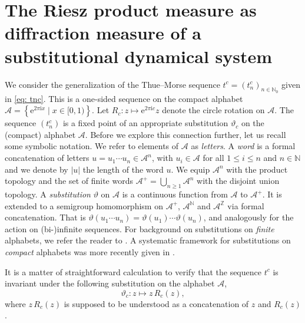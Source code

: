 \documentclass[11pt,reqno]{amsart}
\theoremstyle{plain}
\theoremstyle{definition}
\newcommand{\Z}{{\mathbb Z}}
\newcommand{\N}{{\mathbb N}}
\newcommand{\mc}{\mathcal}
\newcommand{\im}{{\mathrm{i}}}
\newcommand{\me}{\mathrm{e}}
\newcommand{\ts}{\hspace{0.5pt}}
\begin{document}
\section{The Riesz product measure as diffraction measure of a substitutional dynamical system}
\label{SEC:diffraction}



We consider the generalization of the Thue{\ts}--Morse sequence $t^{c} = (t_n^{c})_{n \in \N_0}$ given in \eqref{eq: tnc}.
This is a one-sided sequence on the compact alphabet $\mc A = \left\{ \me^{2 \pi \im x} \mid x \in [0,1) \right\}$. 
Let $R_c \colon z \mapsto \me^{2 \pi \im c} z$ denote the circle rotation on $\mc A$. 
The sequence $(t^{c}_n)$ is a fixed point of an appropriate substitution $\vartheta_c$ on the (compact) alphabet $\mc A$. Before we explore this connection further, let us recall some symbolic notation. We refer to elements of $\mc A$ as \emph{letters}. A \emph{word} is a formal concatenation of letters $u = u_1 \cdots u_n \in \mc A^n$, with $u_i \in \mc A$ for all $1 \leqslant i \leqslant n$ and $n \in \N$ and we denote by $|u|$ the length of the word $u$.
We equip $\mc A^n$ with the product topology and the set of finite words $\mc A^+ = \bigcup_{n\geqslant 1} \mc A^n$ with the disjoint union topology. A \emph{substitution} $\vartheta$ on $\mc A$ is a continuous function from $\mc A$ to $\mc A^+$. It is extended to a semigroup homomorphism on $\mc A^+$, $\mc A^\N$ and $\mc A^\Z$ via formal concatenation. That is $\vartheta(u_1 \cdots u_n) = \vartheta(u_1) \cdots \vartheta(u_n)$, and analogously for the action on (bi-)infinite sequences. For background on substitutions on \emph{finite} alphabets, we refer the reader to \cite{baake}. A systematic framework for substitutions on \emph{compact} alphabets was more recently given in \cite{MRW}.

It is a matter of straightforward calculation to verify that the sequence $t^c$ is invariant under
 the following substitution on the alphabet $\mc A$,
\begin{equation}
\label{EQ:theta-subst}
\vartheta_{c} \colon z \mapsto z \, R_c(z),
\end{equation}
where $z \, R_c(z)$ is supposed to be understood as a concatenation of $z$ and $R_c(z)$.
\end{document}
